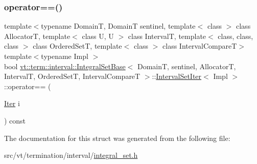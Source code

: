 \mbox{\label{structvt_1_1term_1_1interval_1_1_integral_set_base_1_1_interval_set_iter_a4981392cafb35bd47869470943de003c}} 
\subsubsection{\texorpdfstring{operator==()}{operator==()}}
{\footnotesize\ttfamily template$<$typename DomainT, DomainT sentinel, template$<$ class $>$ class AllocatorT, template$<$ class U, U $>$ class IntervalT, template$<$ class, class, class $>$ class Ordered\+SetT, template$<$ class $>$ class Interval\+CompareT$>$ \\
template$<$typename Impl $>$ \\
bool \hyperlink{structvt_1_1term_1_1interval_1_1_integral_set_base}{vt\+::term\+::interval\+::\+Integral\+Set\+Base}$<$ DomainT, sentinel, AllocatorT, IntervalT, Ordered\+SetT, Interval\+CompareT $>$\+::\hyperlink{structvt_1_1term_1_1interval_1_1_integral_set_base_1_1_interval_set_iter}{Interval\+Set\+Iter}$<$ Impl $>$\+::operator== (\begin{DoxyParamCaption}\item[{\hyperlink{structvt_1_1term_1_1interval_1_1_integral_set_base_1_1_interval_set_iter_a4056b2dcca9f60143d2d76387599e6e1}{Iter}}]{i }\end{DoxyParamCaption}) const\hspace{0.3cm}{\ttfamily [inline]}}



The documentation for this struct was generated from the following file\+:\begin{DoxyCompactItemize}
\item 
src/vt/termination/interval/\hyperlink{integral__set_8h}{integral\+\_\+set.\+h}\end{DoxyCompactItemize}

